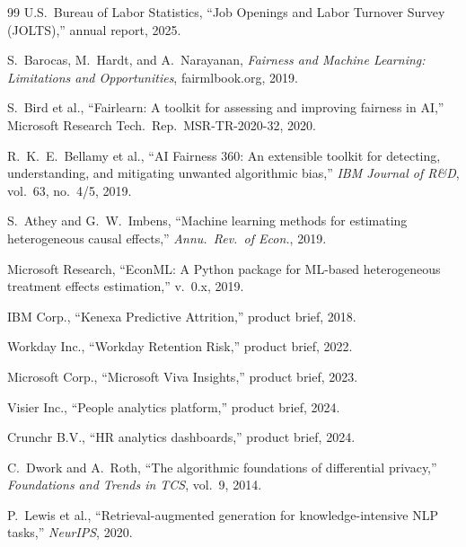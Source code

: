 \documentclass[conference]{IEEEtran}
\begin{document}

\begin{thebibliography}{99}
U.S.\ Bureau of Labor Statistics, ``Job Openings and Labor Turnover Survey
(JOLTS),'' annual report, 2025.

S.~Barocas, M.~Hardt, and A.~Narayanan, \emph{Fairness and Machine Learning:
Limitations and Opportunities}, fairmlbook.org, 2019.

S.~Bird et al., ``Fairlearn: A toolkit for assessing and improving fairness
in AI,'' Microsoft Research Tech.\ Rep.\ MSR-TR-2020-32, 2020.

R.~K.~E.~Bellamy et al., ``AI Fairness 360: An extensible toolkit for
detecting, understanding, and mitigating unwanted algorithmic bias,''
\emph{IBM Journal of R\&D}, vol.~63, no.~4/5, 2019.

S.~Athey and G.~W.~Imbens, ``Machine learning methods for estimating
heterogeneous causal effects,'' \emph{Annu.\ Rev.\ of Econ.}, 2019.

Microsoft Research, ``EconML: A Python package for ML-based heterogeneous
treatment effects estimation,'' v.\ 0.x, 2019.

IBM Corp., ``Kenexa Predictive Attrition,'' product brief, 2018.

Workday Inc., ``Workday Retention Risk,'' product brief, 2022.

Microsoft Corp., ``Microsoft Viva Insights,'' product brief, 2023.

Visier Inc., ``People analytics platform,'' product brief, 2024.

Crunchr B.V., ``HR analytics dashboards,'' product brief, 2024.

C.~Dwork and A.~Roth, ``The algorithmic foundations of differential
privacy,'' \emph{Foundations and Trends in TCS}, vol.~9, 2014.

P.~Lewis et al., ``Retrieval-augmented generation for knowledge-intensive
NLP tasks,'' \emph{NeurIPS}, 2020.
\end{thebibliography}
\end{document}
